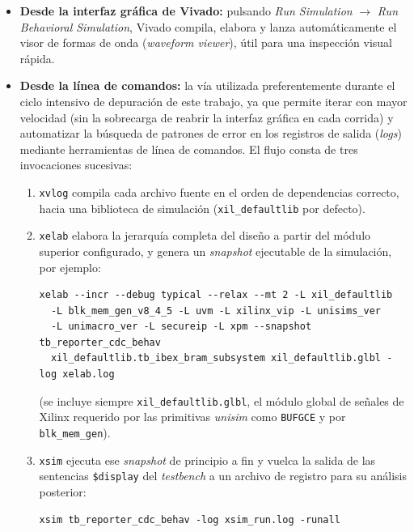 \begin{itemize}
    \item \textbf{Desde la interfaz gráfica de Vivado:} pulsando
    \textit{Run Simulation} $\rightarrow$ \textit{Run Behavioral
    Simulation}, Vivado compila, elabora y lanza automáticamente el visor
    de formas de onda (\textit{waveform viewer}), útil para una inspección
    visual rápida.
    \item \textbf{Desde la línea de comandos:} la vía utilizada
    preferentemente durante el ciclo intensivo de depuración de este
    trabajo, ya que permite iterar con mayor velocidad (sin la sobrecarga
    de reabrir la interfaz gráfica en cada corrida) y automatizar la
    búsqueda de patrones de error en los registros de salida
    (\textit{logs}) mediante herramientas de línea de comandos. El flujo
    consta de tres invocaciones sucesivas:
    \begin{enumerate}
        \item \texttt{xvlog} compila cada archivo fuente en el orden de
        dependencias correcto, hacia una biblioteca de simulación
        (\texttt{xil\_defaultlib} por defecto).
        \item \texttt{xelab} elabora la jerarquía completa del diseño a
        partir del módulo superior configurado, y genera un
        \textit{snapshot} ejecutable de la simulación, por ejemplo:
\begin{verbatim}
xelab --incr --debug typical --relax --mt 2 -L xil_defaultlib
  -L blk_mem_gen_v8_4_5 -L uvm -L xilinx_vip -L unisims_ver
  -L unimacro_ver -L secureip -L xpm --snapshot tb_reporter_cdc_behav
  xil_defaultlib.tb_ibex_bram_subsystem xil_defaultlib.glbl -log xelab.log
\end{verbatim}
        (se incluye siempre \texttt{xil\_defaultlib.glbl}, el módulo
        global de señales de Xilinx requerido por las primitivas
        \textit{unisim} como \texttt{BUFGCE} y por \texttt{blk\_mem\_gen}).
        \item \texttt{xsim} ejecuta ese \textit{snapshot} de principio a
        fin y vuelca la salida de las sentencias \texttt{\$display} del
        \textit{testbench} a un archivo de registro para su análisis
        posterior:
\begin{verbatim}
xsim tb_reporter_cdc_behav -log xsim_run.log -runall
\end{verbatim}
    \end{enumerate}
\end{itemize}



